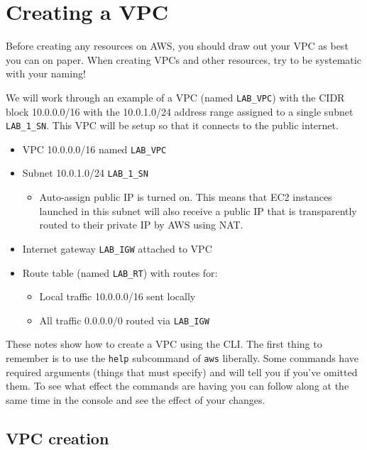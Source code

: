\section{Creating a VPC}\label{creating-a-vpc}

Before creating any resources on AWS, you should draw out your VPC as
best you can on paper. When creating VPCs and other resources, try to be
systematic with your naming!

We will work through an example of a VPC (named \texttt{LAB\_VPC}) with
the CIDR block 10.0.0.0/16 with the 10.0.1.0/24 address range assigned
to a single subnet \texttt{LAB\_1\_SN}. This VPC will be setup so that
it connects to the public internet.

\begin{itemize}
\item
  VPC 10.0.0.0/16 named \texttt{LAB\_VPC}
\item
  Subnet 10.0.1.0/24 \texttt{LAB\_1\_SN}

  \begin{itemize}
  \tightlist
  \item
    Auto-assign public IP is turned on. This means that EC2 instances
    launched in this subnet will also receive a public IP that is
    transparently routed to their private IP by AWS using NAT.
  \end{itemize}
\item
  Internet gateway \texttt{LAB\_IGW} attached to VPC
\item
  Route table (named \texttt{LAB\_RT}) with routes for:

  \begin{itemize}
  \item
    Local traffic 10.0.0.0/16 sent locally
  \item
    All traffic 0.0.0.0/0 routed via \texttt{LAB\_IGW}
  \end{itemize}
\end{itemize}

These notes show how to create a VPC using the CLI. The first thing to
remember is to use the \texttt{help} subcommand of \texttt{aws}
liberally. Some commands have required arguments (things that must
specify) and will tell you if you've omitted them. To see what effect
the commands are having you can follow along at the same time in the
console and see the effect of your changes.

\subsection{VPC creation}\label{vpc-creation}

